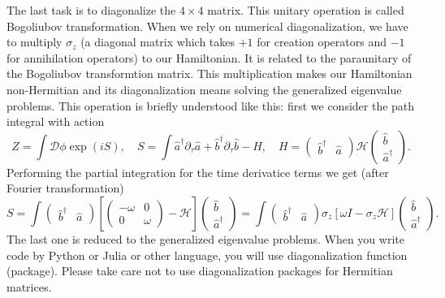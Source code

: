 \documentclass[11pt, aps, longbibliography]{article}
\begin{document}
The last task is to diagonalize the $4\times 4$ matrix. This unitary operation is called Bogoliubov transformation.
When we rely on numerical diagonalization, we have to multiply $\sigma_z$ (a diagonal matrix which takes $+1$ for creation operators and $-1$ for annihilation operators)
to our Hamiltonian. It is related to the paraunitary of the Bogoliubov transformtion matrix.
This multiplication makes our Hamiltonian non-Hermitian and its diagonalization means solving the generalized eigenvalue problems.
This operation is briefly understood like this: first we consider the path integral with action
\begin{equation}
    Z = \int \mathcal{D}\phi \exp (iS), \quad  S=\int  \hat{a}^\dagger \partial_\tau \hat{a} +  \hat{b}^\dagger \partial_\tau \hat{b} - H, \quad H = \begin{pmatrix} \hat{b}^\dagger & \hat{a} \end{pmatrix} \mathcal{H} \begin{pmatrix}\hat{b} \\ \hat{a}^\dagger \end{pmatrix}.
\end{equation}
Performing the partial integration for the time derivatice terms we get (after Fourier transformation)
\begin{equation}
    S = \int \begin{pmatrix}\hat{b}^\dagger & \hat{a} \end{pmatrix} \left[ \begin{pmatrix}
        -\omega & 0 \\ 0 & \omega
    \end{pmatrix} - \mathcal{H} \right]  \begin{pmatrix}\hat{b} \\ \hat{a}^\dagger \end{pmatrix} = \int \begin{pmatrix}\hat{b}^\dagger & \hat{a} \end{pmatrix} \sigma_z \left[ \omega I - \sigma_{z} \mathcal{H} \right]  \begin{pmatrix}\hat{b} \\ \hat{a}^\dagger \end{pmatrix}.
\end{equation}
The last one is reduced to the generalized eigenvalue problems.
When you write code by Python or Julia or other language, you will use diagonalization function (package).
Please take care not to use diagonalization packages for Hermitian matrices.
\end{document}
